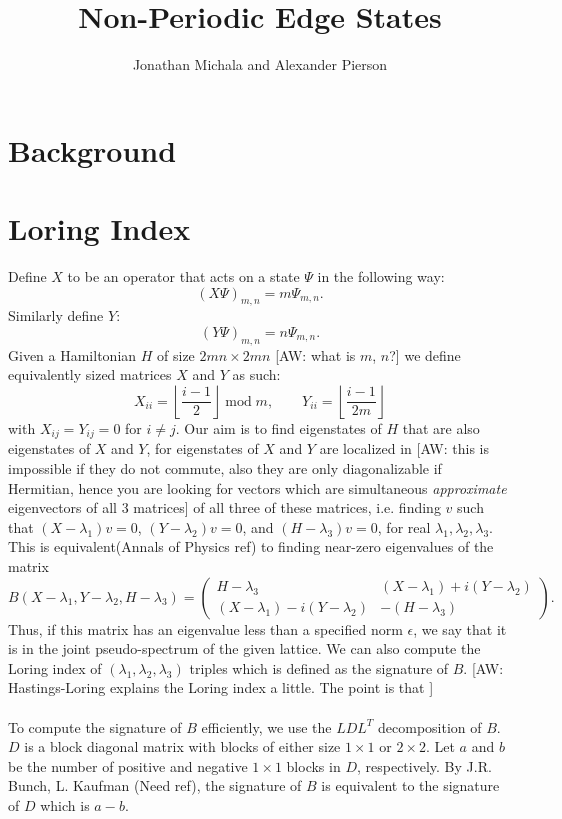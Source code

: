 \documentclass[a4paper]{article}
\title{Non-Periodic Edge States}
\author{Jonathan Michala and Alexander Pierson}
\newcommand{\aw}[1]{{\color{blue} [AW: #1]}}
\begin{document}
\maketitle

\section{Background}
\section{Loring Index}
Define $X$ to be an operator that acts on a state $\Psi$ in the following way:
$$(X \Psi)_{m,n} = m\Psi_{m,n}.$$
Similarly define $Y$:
$$(Y \Psi)_{m,n} = n\Psi_{m,n}.$$
Given a Hamiltonian $H$ of size $2mn \times 2mn$ \aw{what is $m$, $n$?} we define equivalently sized matrices $X$ and $Y$ as such:
$$X_{ii} = \left\lfloor \frac{i-1}{2} \right\rfloor \;\text{mod}\;m, \quad\quad Y_{ii} = \left\lfloor \frac{i-1}{2m} \right\rfloor$$
with $X_{ij} = Y_{ij} = 0$ for $i \neq j$. Our aim is to find eigenstates of $H$ that are also eigenstates of $X$ and $Y$, for eigenstates of $X$ and $Y$ are localized in  \aw{this is impossible if they do not commute, also they are only diagonalizable if Hermitian, hence you are looking for vectors which are simultaneous \emph{approximate} eigenvectors of all 3 matrices} of all three of these matrices, i.e. finding $v$ such that $(X - \lambda_1)v = 0$, $(Y - \lambda_2)v = 0$, and $(H-\lambda_3)v = 0$, for real $\lambda_1,\lambda_2,\lambda_3$. This is equivalent(Annals of Physics ref) to finding near-zero eigenvalues of the matrix
$$B(X - \lambda_1, Y - \lambda_2, H - \lambda_3) =
\begin{pmatrix}
H - \lambda_3 & (X - \lambda_1) + i(Y - \lambda_2)\\
(X - \lambda_1) - i(Y - \lambda_2) & - (H - \lambda_3)
\end{pmatrix}.$$
Thus, if this matrix has an eigenvalue less than a specified norm $\epsilon$, we say that it is in the joint pseudo-spectrum of the given lattice. We can also compute the Loring index of $(\lambda_1,\lambda_2,\lambda_3)$ triples which is defined as the signature of $B$. \aw{Hastings-Loring explains the Loring index a little. The point is that } \\\\
To compute the signature of $B$ efficiently, we use the $LDL^T$ decomposition of $B$. $D$ is a block diagonal matrix with blocks of either size $1 \times 1$ or $2 \times 2$. Let $a$ and $b$ be the number of positive and negative $1 \times 1$ blocks in $D$, respectively. By J.R. Bunch, L. Kaufman (Need ref), the signature of $B$ is equivalent to the signature of $D$ which is $a - b$.
\end{document}
